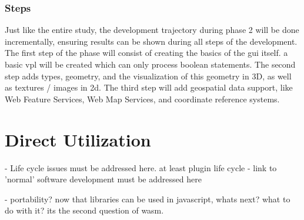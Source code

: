 \subsubsection*{Steps}

Just like the entire study, the development trajectory during phase 2 will be done incrementally, ensuring results can be shown during all steps of the development. 
The first step of the phase will consist of creating the basics of the \ac{gui} itself. a basic \ac{vpl} will be created which can only process boolean statements. The second step adds types, geometry, and the visualization of this geometry in 3D, as well as textures / images in 2d. The third step will add geospatial data support, like Web Feature Services, Web Map Services, and coordinate reference systems.  


\section{Direct Utilization}
\label{sec:method-three}
\mySubRQThree

\begin{note}
  - Life cycle issues must be addressed here. at least plugin life cycle
  - link to 'normal' software development must be addressed here 

  - portability? now that libraries can be used in javascript, whats next? what to do with it? its the second question of wasm.

\end{note}






